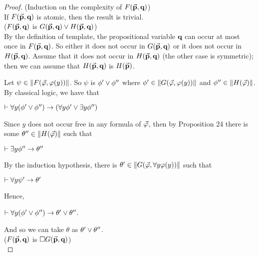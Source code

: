 \begin{proof} (Induction on the complexity of $F(\vec{\textbf{p}},\textbf{q})$)\\
	
	\qquad If $F(\vec{\textbf{p}},\textbf{q})$ is atomic, then the result is trivial.\\
	
	($F(\vec{\textbf{p}},\textbf{q})$ is $G(\vec{\textbf{p}},\textbf{q})\vee H(\vec{\textbf{p}},\textbf{q})$)\\
	
	
	\qquad By the definition of template, the propositional variable $\textbf{q}$ can occur at most once in $F(\vec{\textbf{p}},\textbf{q})$. So either it does not occur in $G(\vec{\textbf{p}},\textbf{q})$ or it does not occur in  $H(\vec{\textbf{p}},\textbf{q})$. Assume that it does not occur in $H(\vec{\textbf{p}},\textbf{q})$ (the other case is symmetric); then we can assume that $H(\vec{\textbf{p}},\textbf{q})$ is $H(\vec{\textbf{p}})$.    
	
	\qquad Let $\psi \in \Arrowvert F(\vec{\varphi},\varphi(y)) \Arrowvert$. So $\psi$ is $\phi^{\prime} \vee \phi^{\prime\prime}$ where  $\phi^{\prime} \in \Arrowvert G(\vec{\varphi},\varphi(y)) \Arrowvert$ and  $\phi^{\prime\prime} \in \Arrowvert H(\vec{\varphi}) \Arrowvert$. By classical logic, we have that 
	
	\begin{center}    
		$\vdash \forall y (\phi^{\prime} \vee \phi^{\prime\prime}) \rightarrow (\forall y \phi^{\prime} \vee \exists y \phi^{\prime\prime})$
	\end{center}
	
	\qquad Since $y$ does not occur free in any formula of $\vec{\varphi}$, then by Proposition 24 there is some $\theta^{\prime\prime} \in \Arrowvert H(\vec{\varphi}) \Arrowvert$ such that 
	
	
	\begin{center}    
		$\vdash \exists y \phi^{\prime\prime} \rightarrow \theta^{\prime\prime}$
	\end{center}
	
	\qquad By the induction hypothesis, there is $\theta^{\prime} \in \Arrowvert G(\vec{\varphi},\forall y \varphi (y)) \Arrowvert$ such that
	
	\begin{center}
		$\vdash \forall y \psi^{\prime} \rightarrow \theta^{\prime}$ 
	\end{center}    
Hence,    
	
	\begin{center}    
		$\vdash \forall y (\phi^{\prime} \vee \phi^{\prime\prime}) \rightarrow \theta^{\prime} \vee \theta^{\prime\prime}$.
	\end{center}    
	
	
	\qquad And so we can take $\theta$ as $\theta^{\prime} \vee \theta^{\prime\prime}$.    \\
	
	
	($F(\vec{\textbf{p}},\textbf{q})$ is $\Box G(\vec{\textbf{p}},\textbf{q})$)\\
	

\end{proof}
